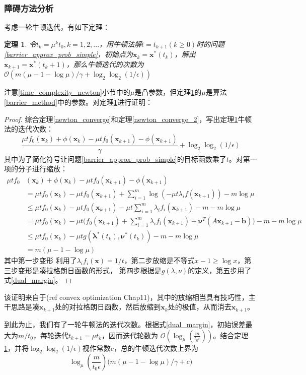 \documentclass{article}
\newtheorem{thm}{定理}
\begin{document}
\subsubsection{障碍方法分析}
考虑一轮牛顿迭代，有如下定理：
\begin{thm}
    \label{newton_barrier_ana}
    令$t_k=\mu^kt_0,k=1,2,...$，用牛顿法解$t=t_{k+1}(k\ge 0)$时的问题\ref{barrier_approx_prob_simple}，初始点为$\bm x_k=\bm x^*(t_{k})$，解出$\bm x_{k+1}=\bm x^*(t_k+1)$，那么牛顿迭代的次数为
    $\mathcal O(m(\mu-1-\log\mu)/\gamma+\log_2\log_2(1/\epsilon))$
\end{thm}
注意\ref{time_complexity_newton}小节中的$\mu$是凸参数，但定理\ref{newton_barrier_ana}的$\mu$是算法\ref{barrier_method}中的参数。对定理\ref{newton_barrier_ana}进行证明：
\begin{proof}
    综合定理\ref{newton_converge}和定理\ref{newton_converge_2}，写出定理\ref{newton_barrier_ana}牛顿法的迭代次数：
    $$\frac{\mu tf_0(\bm x_{k})+\phi(\bm x_k)-\mu tf_0(\bm x_{k+1})-\phi(\bm x_{k+1})}{\gamma}+\log_2\log_2(1/\epsilon)$$
    其中为了简化符号让问题\ref{barrier_approx_prob_simple}的目标函数乘了$t$。对第一项的分子进行缩放：
\begin{align*}
\mu tf_0&(\bm x_{k})+\phi(\bm x_k)-\mu tf_0(\bm x_{k+1})-\phi(\bm x_{k+1}) \\
&=\mu tf_0(\bm x_{k})-\mu tf_0(\bm x_{k+1})+\sum_{i=1}^m{\log(-\mu t\lambda_if(\bm x_{k+1}))-m\log \mu} \\
&\le \mu tf_0(\bm x_k)-\mu tf_0(\bm x_{k+1})-\mu t\sum_{i=1}^m{\lambda_i f_i(\bm x_{k+1})}-m-m\log \mu \\
&=\mu tf_0(\bm x_k)-\mu t\Big(f_0(\bm x_{k+1})+\sum_{i=1}^m{\lambda_if_i(\bm x_{k+1})}+\bm \nu^T(A\bm x_{k+1}-\bm b)\Big)-m-m\log\mu\\
&\le \mu tf_0(\bm x_k)-\mu tg(\bm \lambda^*(t_k),\bm \nu^*(t_k))-m-m\log\mu\\
&=m(\mu-1-\log\mu)
\end{align*}
其中第一步变形
利用了$\lambda_if_i(\bm x)=1/t$，第二步放缩是不等式$x-1\ge \log x$，第三步变形是凑拉格朗日函数的形式，
第四步根据是$g(\lambda,\nu)$的定义，第五步用了式\eqref{dual_margin}。
\end{proof}
该证明来自于(ref convex optimization Chap11)，其中的放缩相当具有技巧性，主干思路是凑$\bm x_{k+1}$处的对拉格朗日函数，然后放缩到$\bm x_k$处的极值，从而消去$\bm x_{k+1}$。

到此为止，我们有了一轮牛顿法的迭代次数。根据式\eqref{dual_margin}，初始误差最大为$m/t_0$，每轮迭代$t_{k+1}=\mu t_k$，因而迭代轮数为
$\mathcal O(\log_\mu(\frac{m}{t_0\epsilon}))$。结合定理\ref{newton_barrier_ana}，并将$\log_2\log_2(1/\epsilon)$视作常数$c$，总的牛顿迭代次数上界为
$$\log_\mu(\frac{m}{t_0\epsilon})\Big(m(\mu-1-\log\mu)/\gamma+c\Big)$$
\end{document}
